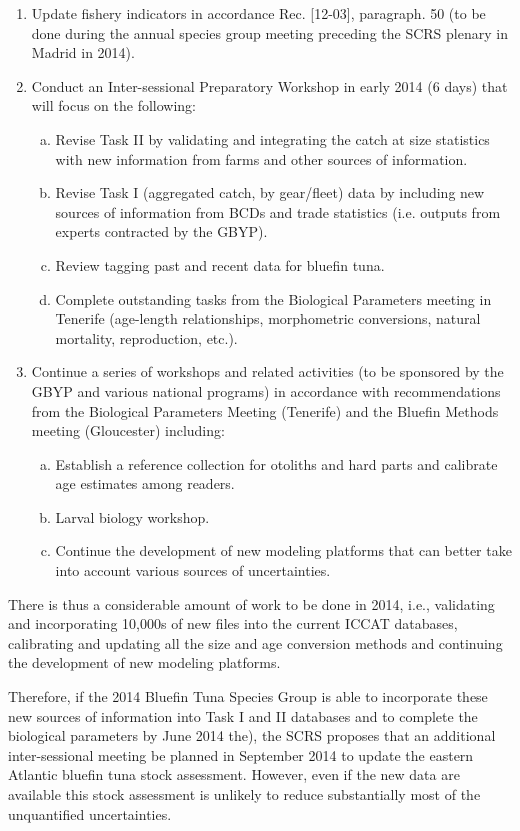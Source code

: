 \begin{enumerate}[1.]

\item Update fishery indicators in accordance Rec. [12-03], paragraph. 50 (to be done during the annual species group meeting preceding the SCRS plenary in Madrid in 2014).
\item Conduct an Inter-sessional Preparatory Workshop in early 2014 (6 days) that will focus on the following: 
\begin{enumerate}[a)] 
 \item Revise Task II by validating and integrating the catch at size statistics with new information from farms and other sources of information.
 \item Revise Task I (aggregated catch, by gear/fleet) data by including new sources of information from BCDs and trade statistics (i.e. outputs from experts contracted by the GBYP).
 \item Review tagging past and recent data for bluefin tuna.
 \item Complete outstanding tasks from the Biological Parameters meeting in Tenerife (age-length relationships, morphometric conversions, natural mortality, reproduction, etc.).
\end{enumerate}
\item Continue a series of workshops and related activities (to be sponsored by the GBYP and various national programs) in accordance with recommendations from the Biological Parameters Meeting (Tenerife) and the Bluefin Methods meeting (Gloucester) including:
\begin{enumerate}[a)] 
\item Establish a reference collection for otoliths and hard parts and calibrate age estimates among readers.
\item Larval biology workshop.
\item Continue the development of new modeling platforms that can better take into account various sources of uncertainties.
\end{enumerate}
\end{enumerate}

There is thus a considerable amount of work to be done in 2014, i.e., validating and incorporating 10,000s of new files into the current ICCAT databases, calibrating and updating all the size and age conversion methods and continuing the development of new modeling platforms.

Therefore, if the 2014 Bluefin Tuna Species Group is able to incorporate these new sources of information into Task I and II databases and to complete the biological parameters by June 2014 the), the SCRS proposes that an additional inter-sessional meeting be planned in September 2014 to update the eastern Atlantic bluefin tuna stock assessment.  However, even if the new data are available this stock assessment is unlikely to reduce substantially most of the unquantified uncertainties. 

